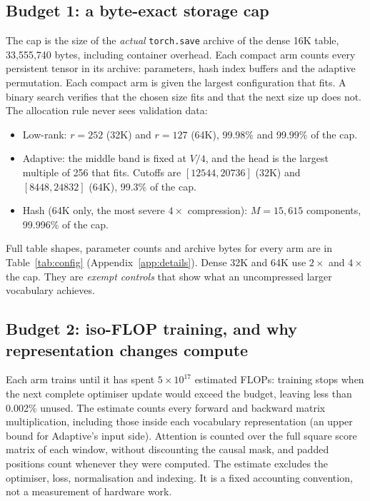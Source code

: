 \documentclass[10pt,a4paper]{article}
\begin{document}
\subsection{Budget 1: a byte-exact storage cap}
\label{sec:storage}
The cap is the size of the \emph{actual} \texttt{torch.save} archive of the dense 16K table,
33,555,740 bytes, including container overhead. Each compact arm counts every persistent tensor in its
archive: parameters, hash index buffers and the adaptive permutation. Each compact arm is given the largest
configuration that fits. A binary search verifies that the chosen size fits and that the next size up does
not. The allocation rule never sees validation data:
\begin{itemize}
  \item Low-rank: $r=252$ (32K) and $r=127$ (64K), 99.98\% and 99.99\% of the cap.
  \item Adaptive: the middle band is fixed at $V/4$, and the head is the largest multiple of 256 that fits.
        Cutoffs are $[12544, 20736]$ (32K) and $[8448, 24832]$ (64K), 99.3\% of the cap.
  \item Hash (64K only, the most severe $4\times$ compression): $M=15{,}615$ components, 99.996\% of the cap.
\end{itemize}
Full table shapes, parameter counts and archive bytes for every arm are in Table~\ref{tab:config} (Appendix~\ref{app:details}).
Dense 32K and 64K use $2\times$ and $4\times$ the cap. They are \emph{exempt controls} that show what an
uncompressed larger vocabulary achieves.

\subsection{Budget 2: iso-FLOP training, and why representation changes compute}
\label{sec:flops}
Each arm trains until it has spent $5\times10^{17}$ estimated FLOPs: training stops when the next
complete optimiser update would exceed the budget, leaving less than 0.002\% unused. The estimate counts
every forward and backward matrix multiplication, including those inside each vocabulary representation (an
upper bound for Adaptive's input side). Attention is counted over the full square score matrix of each
window, without discounting the causal mask, and padded positions count whenever they were computed. The
estimate excludes the optimiser, loss, normalisation and indexing. It is a fixed accounting convention, not a
measurement of hardware work.
\end{document}
